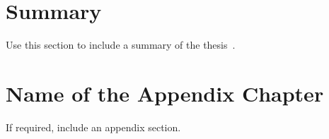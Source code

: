 \documentclass[a4paper,12pt,twoside,no-math]{report}
\begin{document}
\clearpage

\newpage
\chapter{Summary}\label{chap:summary}

\renewcommand\thefigure{\thechapter.\arabic{figure}}    
\renewcommand{\theequation}{\thechapter.\arabic{equation}}
\setcounter{equation}{0}
\setcounter{figure}{0}

Use this section to include a summary of the thesis~\cite{article_name}.


\newpage
\appendix


\chapter{Name of the Appendix Chapter}\label{app:appendix1}

\renewcommand\thefigure{\thechapter.\arabic{figure}}    
\renewcommand{\theequation}{\thechapter.\arabic{equation}}
\setcounter{equation}{0}
\setcounter{figure}{0}

If required, include an appendix section.


\clearpage

\newpage



\end{document}
